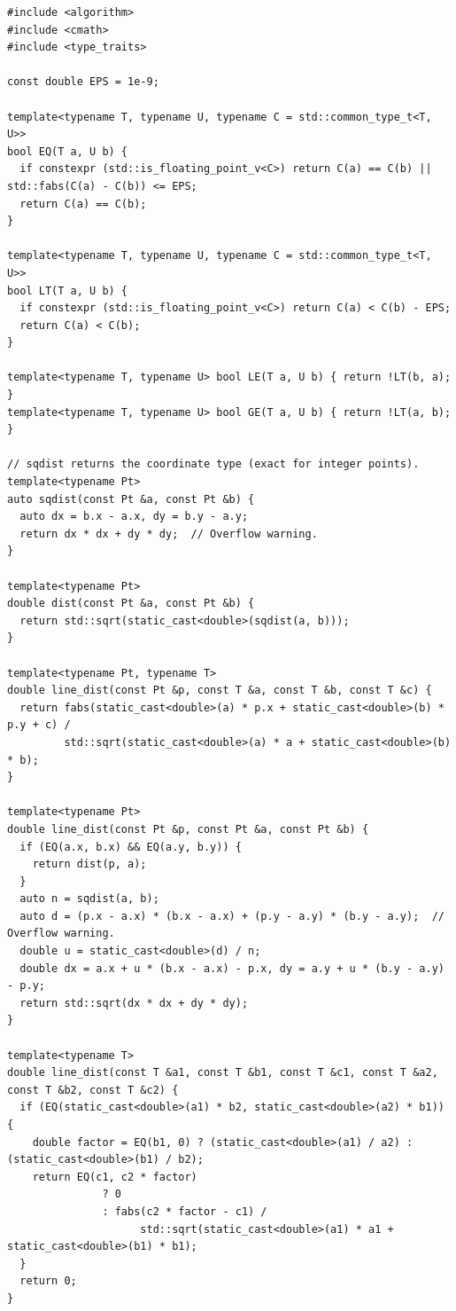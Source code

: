 \begin{lstlisting}[style=cpp]
#include <algorithm>
#include <cmath>
#include <type_traits>

const double EPS = 1e-9;

template<typename T, typename U, typename C = std::common_type_t<T, U>>
bool EQ(T a, U b) {
  if constexpr (std::is_floating_point_v<C>) return C(a) == C(b) || std::fabs(C(a) - C(b)) <= EPS;
  return C(a) == C(b);
}

template<typename T, typename U, typename C = std::common_type_t<T, U>>
bool LT(T a, U b) {
  if constexpr (std::is_floating_point_v<C>) return C(a) < C(b) - EPS;
  return C(a) < C(b);
}

template<typename T, typename U> bool LE(T a, U b) { return !LT(b, a); }
template<typename T, typename U> bool GE(T a, U b) { return !LT(a, b); }

// sqdist returns the coordinate type (exact for integer points).
template<typename Pt>
auto sqdist(const Pt &a, const Pt &b) {
  auto dx = b.x - a.x, dy = b.y - a.y;
  return dx * dx + dy * dy;  // Overflow warning.
}

template<typename Pt>
double dist(const Pt &a, const Pt &b) {
  return std::sqrt(static_cast<double>(sqdist(a, b)));
}

template<typename Pt, typename T>
double line_dist(const Pt &p, const T &a, const T &b, const T &c) {
  return fabs(static_cast<double>(a) * p.x + static_cast<double>(b) * p.y + c) /
         std::sqrt(static_cast<double>(a) * a + static_cast<double>(b) * b);
}

template<typename Pt>
double line_dist(const Pt &p, const Pt &a, const Pt &b) {
  if (EQ(a.x, b.x) && EQ(a.y, b.y)) {
    return dist(p, a);
  }
  auto n = sqdist(a, b);
  auto d = (p.x - a.x) * (b.x - a.x) + (p.y - a.y) * (b.y - a.y);  // Overflow warning.
  double u = static_cast<double>(d) / n;
  double dx = a.x + u * (b.x - a.x) - p.x, dy = a.y + u * (b.y - a.y) - p.y;
  return std::sqrt(dx * dx + dy * dy);
}

template<typename T>
double line_dist(const T &a1, const T &b1, const T &c1, const T &a2, const T &b2, const T &c2) {
  if (EQ(static_cast<double>(a1) * b2, static_cast<double>(a2) * b1)) {
    double factor = EQ(b1, 0) ? (static_cast<double>(a1) / a2) : (static_cast<double>(b1) / b2);
    return EQ(c1, c2 * factor)
               ? 0
               : fabs(c2 * factor - c1) /
                     std::sqrt(static_cast<double>(a1) * a1 + static_cast<double>(b1) * b1);
  }
  return 0;
}


\end{lstlisting}
